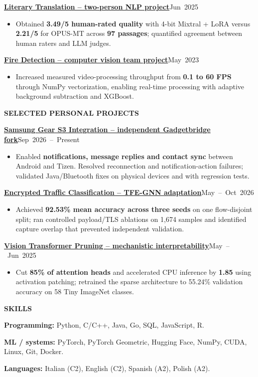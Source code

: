 \documentclass[11pt,a4paper]{article}
\newcommand{\cvsection}[1]{%
  \par\addvspace{7pt}\needspace{40pt}%
  {\fontsize{11.2}{14}\selectfont\bfseries\MakeUppercase{#1}}\par
  \vspace{2pt}{\color{linecolor}\hrule height .4pt}\vspace{4pt}}
\newcommand{\entry}[2]{%
  \par\addvspace{4pt}\needspace{36pt}%
  {\bfseries #1}\hfill{\fontsize{9.6}{12}\selectfont\color{muted}\mbox{#2}}\par}
\newcommand{\project}[3]{%
  \entry{\href{#1}{#2}}{#3}}
\newcommand{\outcome}[1]{%
  \begin{itemize}\item #1\end{itemize}}
\begin{document}
\project{https://github.com/Alessio-Olivieri/MNLP-Homework2}
  {Literary Translation -- two-person NLP project}{Jun 2025}
\outcome{Obtained \textbf{3.49/5 human-rated quality} with 4-bit Mixtral + LoRA versus \textbf{2.21/5} for OPUS-MT across \textbf{97 passages}; quantified agreement between human raters and LLM judges.}

\project{https://github.com/ami-sc/fire-detection}
  {Fire Detection -- computer vision team project}{May 2023}
\outcome{Increased measured video-processing throughput from \textbf{0.1 to 60 FPS} through NumPy vectorization, enabling real-time processing with adaptive background subtraction and XGBoost.}

\cvsection{Selected Personal Projects}
\project{https://github.com/Alessio-Olivieri/gadgetbridge-gear-s3}
  {Samsung Gear S3 Integration -- independent Gadgetbridge fork}{Sep 2026 -- Present}
\outcome{Enabled \textbf{notifications, message replies and contact sync} between Android and Tizen. Resolved reconnection and notification-action failures; validated Java/Bluetooth fixes on physical devices and with regression tests.}

\project{https://github.com/Alessio-Olivieri/TFE-GNN/tree/public-release}
  {Encrypted Traffic Classification -- TFE-GNN adaptation}{May -- Oct 2026}
\outcome{Achieved \textbf{92.53\% mean accuracy across three seeds} on one flow-disjoint split; ran controlled payload/TLS ablations on 1,674 samples and identified capture overlap that prevented independent validation.}

\project{https://github.com/Alessio-Olivieri/automatic-circuit-discovery-for-vision-transformer}
  {Vision Transformer Pruning -- mechanistic interpretability}{May -- Jun 2025}
\outcome{Cut \textbf{85\% of attention heads} and accelerated CPU inference by \textbf{1.85\texttimes{}} using activation patching; retrained the sparse architecture to 55.24\% validation accuracy on 58 Tiny ImageNet classes.}

\cvsection{Skills}
\textbf{Programming:} Python, C/C++, Java, Go, SQL, JavaScript, R.\par
\textbf{ML / systems:} PyTorch, PyTorch Geometric, Hugging Face, NumPy, CUDA, Linux, Git, Docker.\par
\textbf{Languages:} Italian (C2), English (C2), Spanish (A2), Polish (A2).
\end{document}
